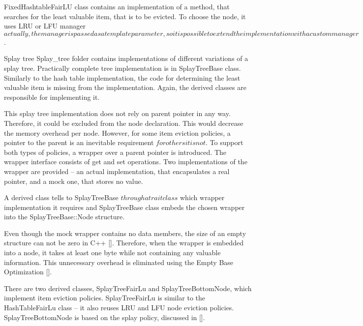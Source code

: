 FixedHashtableFairLU class contains an implementation of a method, that searches for the least valuable item, that is to be evicted. To choose the node, it uses LRU or LFU manager \(actually, the manager is passed as a template parameter, so it is possible to extend the implementation with a custom manager\).

Splay tree
Splay\_tree folder contains implementations of different variations of a splay tree. Practically complete tree implementation is in SplayTreeBase class. Similarly to the hash table implementation, the code for determining the least valuable item is missing from the implementation. Again, the derived classes are responsible for implementing it.

This splay tree implementation does not rely on parent pointer in any way. Therefore, it could be excluded from the node declaration. This would decrease the memory overhead per node. However, for some item eviction policies, a pointer to the parent is an inevitable requirement \(for others it is not\). To support both types of policies, a wrapper over a parent pointer is introduced. The wrapper interface consists of get and set operations. Two implementations of the wrapper are provided – an actual implementation, that encapsulates a real pointer, and a mock one, that stores no value.

A derived class tells to SplayTreeBase \(through a trait class\) which wrapper implementation it requires and SplayTreeBase class embeds the chosen wrapper into the SplayTreeBase::Node structure.

Even though the mock wrapper contains no data members, the size of an empty structure can not be zero in C++ []. Therefore, when the wrapper is embedded into a node, it takes at least one byte while not containing any valuable information. This unnecessary overhead is eliminated using the Empty Base Optimization [].

There are two derived classes, SplayTreeFairLu and SplayTreeBottomNode, which implement item eviction policies. SplayTreeFairLu is similar to the HashTableFairLu class – it also reuses LRU and LFU node eviction policies. SplayTreeBottomNode is based on the splay policy, discussed in [].
